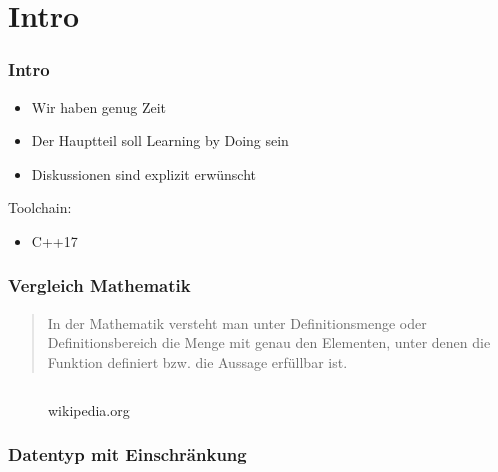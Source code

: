 \section{Intro}

\begin{frame}[fragile]
	\frametitle{Intro}
	\begin{itemize}
		\item Wir haben genug Zeit
		\item Der Hauptteil soll Learning by Doing sein
		\item Diskussionen sind explizit erwünscht
	\end{itemize}

	\vspace{5mm}
	Toolchain:
	\begin{itemize}
		\item C++17
	\end{itemize}
\end{frame}

\begin{frame}[fragile]
	\frametitle{Vergleich Mathematik}
	\begin{quote}
		In der Mathematik versteht man unter Definitionsmenge oder Definitionsbereich die Menge mit genau den Elementen, unter denen die Funktion definiert bzw. die Aussage erfüllbar ist.
	\end{quote}
	\begin{figure}
		\begin{minipage}{.3\textwidth}
			
			\caption{wikipedia.org}
		\end{minipage}\hspace{10mm}%
		\begin{minipage}{0.6\textwidth}
			\inputminted[fontsize=\small,firstline=5,lastline=17,framesep=5mm]{cpp}{../code/src/01_intro.cpp}
		\end{minipage}%
	\end{figure}
\end{frame}

\begin{frame}[fragile]
	\frametitle{Datentyp mit Einschränkung}
	\inputminted[fontsize=\small,firstline=5,lastline=17,framesep=5mm]{cpp}{../code/src/02_intro.cpp}
\end{frame}

